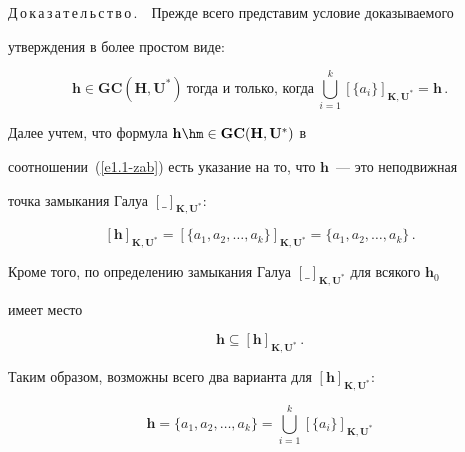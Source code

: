 


\noindent

Д\,о\,к\,а\,з\,а\,т\,е\,л\,ь\,с\,т\,в\,о\,.\ \  Прежде всего представим условие доказываемого 

утверждения в более простом виде:

\begin{equation}

\mathbf{h}\in \mathbf{GC}(\mathbf{H},\mathbf{U}^*)\ \mbox{тогда и только, когда}\ 

\mathop{\bigcup}\limits_{i=1}^k \left[\{ a_i\}\right]_{\mathbf{K},\mathbf{U}^*}=\mathbf{h}\,.

\label{e1.1-zab}

\end{equation} 

Далее учтем, что формула $\mathbf{h}\hm\in \mathbf{GC}(\mathbf{H}, \mathbf{U}^*)$ в 

соотношении~(\ref{e1.1-zab}) есть указание на то, что $\mathbf{h}$~--- это неподвижная 

точка замыкания Галуа $[\_ ]_{\mathbf{K},\mathbf{U}^*}$:

$$

[\mathbf{h}]_{\mathbf{K},\mathbf{U}^*} = [\{a_1, a_2, \ldots , a_k\}]_{\mathbf{K},\mathbf{U}^*} = 

\{a_1, a_2, \ldots , a_k\}\,.

$$

Кроме того, по определению замыкания Галуа $[\_ ]_{\mathbf{K},\mathbf{U}^*}$ для всякого $\mathbf{h}_0$ 

имеет место

\begin{equation}

\mathbf{h}\subseteq  [\mathbf{h}]_{\mathbf{K},\mathbf{U}^*}\,.   

\label{e1.2-zab}

\end{equation}

Таким образом, возможны всего два варианта для $[\mathbf{h}]_{\mathbf{K},\mathbf{U}^*}$:

\begin{equation}

\mathbf{h} = \{a_1, a_2, \ldots , a_k\} = \mathop{\bigcup}\limits_{i=1}^k [\{a_i\}]_{\mathbf{K},\mathbf{U}^*}

\label{e1.2.1-zab}

\end{equation}

